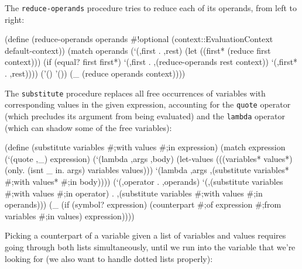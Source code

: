 \documentclass[acmsmall]{acmart}
\newenvironment{Snippet}{\Verbatim[samepage=true]}{\endVerbatim}
\begin{document}
The \texttt{reduce-operands} procedure tries to reduce each of its
operands, from left to right:


\begin{Snippet}
(define (reduce-operands operands #!optional (context::EvaluationContext 
                                                         default-context))
  (match operands
    (`(,first . ,rest)
     (let ((first* (reduce first context)))
       (if (equal? first first*)
	   `(,first . ,(reduce-operands rest context))
	   `(,first* . ,rest))))
\end{Snippet}
\begin{Snippet}
    ('()
     '())
\end{Snippet}
\begin{Snippet}
    (_
     (reduce operands context))))
\end{Snippet}

The \texttt{substitute} procedure replaces all free occurrences of variables
with corresponding values in the given expression, accounting for
the \texttt{quote} operator (which precludes its argument from being evaluated)
and the \texttt{lambda} operator (which can shadow some of the free variables):

\begin{Snippet}
(define (substitute variables #;with values #;in expression)
  (match expression
\end{Snippet}
\begin{Snippet}
    (`(quote ,_)
     expression)
\end{Snippet}
\begin{Snippet}
    (`(lambda ,args ,body)
     (let-values (((variables* values*) (only. (isnt _ in. args) variables values)))
       `(lambda ,args
	  ,(substitute variables* #;with values* #;in body))))
\end{Snippet}
\begin{Snippet}
    (`(,operator . ,operands)
     `(,(substitute variables #;with values #;in operator)
       . ,(substitute variables #;with values #;in operands)))
\end{Snippet}
\begin{Snippet}
    (_
     (if (symbol? expression)
	 (counterpart #;of expression #;from variables #;in values)
	 expression))))
\end{Snippet}

Picking a counterpart of a variable given a list of variables and
values requires going through both lists simultaneously, until we run
into the variable that we're looking for (we also want to handle
dotted lists properly):
\end{document}
